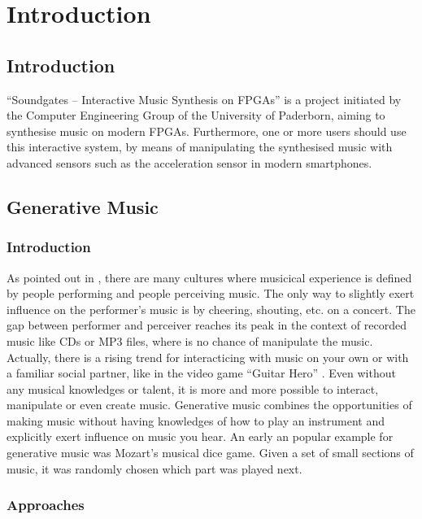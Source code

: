 \chapter{Introduction}
\section{Introduction}
"`Soundgates – Interactive Music Synthesis on FPGAs"' is a project initiated by the Computer Engineering Group of the University of Paderborn, aiming to synthesise music on modern FPGAs. Furthermore, one or more users should use this interactive system, by means of manipulating the synthesised music with advanced sensors such as the acceleration sensor in modern smartphones. 

	
	
	
\section{Generative Music}



\subsection{Introduction}

As pointed out in \cite{Chandra2012}, there are many cultures where musicical experience is defined by people performing and people perceiving music. The only way to slightly exert influence on the performer's music is by cheering, shouting, etc. on a concert. The gap between performer and perceiver reaches its peak in the context of recorded music like CDs or MP3 files, where is no chance of manipulate the music. 
Actually, there is a rising trend for interacticing with music on your own or with a familiar social partner, like in the video game "`Guitar Hero"' \cite{Chandra2012, Planck2009}. Even without any musical knowledges or talent, it is more and more possible to interact, manipulate or even create music. Generative music combines the opportunities of making music without having knowledges of how to play an instrument and explicitly exert influence on music you hear. An early an popular example for generative music was Mozart's musical dice game. Given a set of small sections of music, it was randomly chosen which part was played next.



\subsection{Approaches} 

